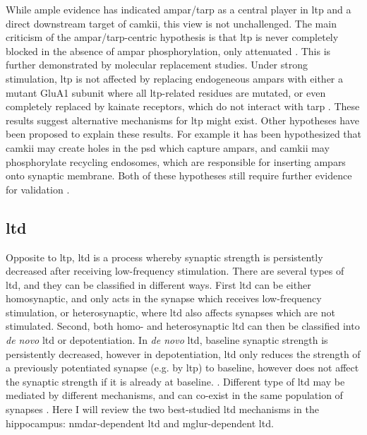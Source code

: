 While ample evidence has indicated \gls{ampar}\slash\gls{tarp} as a central player in \gls{ltp} and a direct downstream target of \gls{camkii}, this view is not unchallenged. The main criticism of the \gls{ampar}\slash\gls{tarp}-centric hypothesis is that \gls{ltp} is never completely blocked in the absence of \gls{ampar} phosphorylation, only attenuated \citep{herring16}. This is further demonstrated by molecular replacement studies. Under strong stimulation, \gls{ltp} is not affected by replacing endogeneous \glspl{ampar} with either a mutant GluA1 subunit where all \gls{ltp}-related residues are mutated, or even completely replaced by kainate receptors, which do not interact with \gls{tarp} \citep{granger13, chen03}. These results suggest alternative mechanisms for \gls{ltp} might exist. Other hypotheses have been proposed to explain these results. For example it has been hypothesized that \gls{camkii} may create holes in the \gls{psd} which capture \glspl{ampar}, and \gls{camkii} may phosphorylate recycling endosomes, which are responsible for inserting \glspl{ampar} onto synaptic membrane. Both of these hypotheses still require further evidence for validation \citep{herring16}.

\subsection{\gls{ltd}}

Opposite to \gls{ltp}, \gls{ltd} is a process whereby synaptic strength is persistently decreased after receiving low-frequency stimulation. There are several types of \gls{ltd}, and they can be classified in different ways. First \gls{ltd} can be either homosynaptic, and only acts in the synapse which receives low-frequency stimulation, or heterosynaptic, where \gls{ltd} also affects synapses which are not stimulated. Second, both homo- and heterosynaptic \gls{ltd} can then be classified into \textit{de novo} \gls{ltd} or depotentiation. In \textit{de novo} \gls{ltd}, baseline synaptic strength is persistently decreased, however in depotentiation, \gls{ltd} only reduces the strength of a previously potentiated synapse (e.g. by \gls{ltp}) to baseline, however does not affect the synaptic strength if it is already at baseline. \citep{collingridge10}. Different type of \gls{ltd} may be mediated by different mechanisms, and can co-exist in the same population of synapses \citep{collingridge10}. Here I will review the two best-studied \gls{ltd} mechanisms in the hippocampus: \gls{nmdar}-dependent \gls{ltd} and \gls{mglur}-dependent \gls{ltd}.

